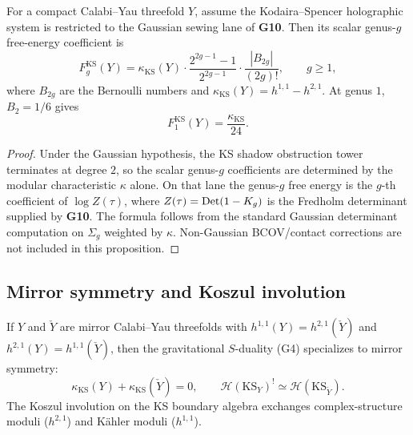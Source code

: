 \begin{proposition}
For a compact Calabi--Yau threefold $Y$, assume the Kodaira--Spencer
holographic system is restricted to the Gaussian sewing lane of
\textbf{G10}. Then its scalar genus-$g$ free-energy coefficient is
\begin{equation}%
F_g^{\mathrm{KS}}(Y)
= \kappa_{\mathrm{KS}}(Y) \cdot \frac{2^{2g-1}-1}{2^{2g-1}}
\cdot\frac{|B_{2g}|}{(2g)!},
\qquad g \ge 1,
\end{equation}
where $B_{2g}$ are the Bernoulli numbers and
$\kappa_{\mathrm{KS}}(Y) = h^{1,1} - h^{2,1}$.
At genus $1$, $B_2 = 1/6$ gives
\begin{equation}%
F_1^{\mathrm{KS}}(Y) = \frac{\kappa_{\mathrm{KS}}}{24}.
\end{equation}
\end{proposition}

\begin{proof}
Under the Gaussian hypothesis, the KS shadow obstruction tower
terminates at degree $2$, so the scalar genus-$g$ coefficients are
determined by the modular characteristic $\kappa$ alone. On that lane
the genus-$g$ free energy is the $g$-th coefficient of
\(\log Z(\tau)\), where \(Z(\tau)=\operatorname{Det}(1-K_g)\) is the Fredholm
determinant supplied by \textbf{G10}. The formula follows from the
standard Gaussian determinant computation on \(\Sigma_g\) weighted by
\(\kappa\). Non-Gaussian BCOV/contact corrections are not included in
this proposition.
\end{proof}


\subsection{Mirror symmetry and Koszul involution}

\begin{corollary}[Mirror symmetry = $S$-duality; \ClaimStatusProvedHere]
If $Y$ and $\check{Y}$ are mirror Calabi--Yau threefolds with
$h^{1,1}(Y) = h^{2,1}(\check{Y})$ and
$h^{2,1}(Y) = h^{1,1}(\check{Y})$, then the gravitational
$S$-duality (G4) specializes to mirror symmetry:
\begin{equation}%
\kappa_{\mathrm{KS}}(Y) + \kappa_{\mathrm{KS}}(\check{Y}) = 0,
\qquad
\mathcal{H}(\mathrm{KS}_Y)^! \simeq \mathcal{H}(\mathrm{KS}_{\check{Y}}).
\end{equation}
The Koszul involution on the KS boundary algebra exchanges
complex-structure moduli ($h^{2,1}$) and K\"ahler moduli ($h^{1,1}$).
\end{corollary}


